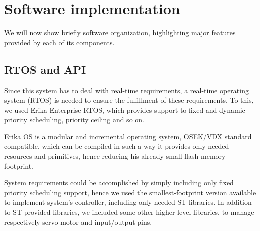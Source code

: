 \chapter{Software implementation}



We will now show briefly software organization, highlighting major features provided by each of its components.



\section{RTOS and API}

Since this system has to deal with real-time requirements, a real-time operating system (RTOS) is needed to ensure the fulfillment of these requirements. To this, we used Erika Enterprise RTOS, which provides support to fixed and dynamic priority scheduling, priority ceiling and so on.

Erika OS is a modular and incremental operating system, OSEK/VDX standard compatible, which can be compiled in such a way it provides only needed resources and primitives, hence reducing his already small flash memory footprint.

System requirements could be accomplished by simply including only fixed priority scheduling support, hence we used the smallest-footprint version available to implement system's controller, including only needed ST libraries. In addition to ST provided libraries, we included some other higher-level libraries, to manage respectively servo motor and input/output pins.



